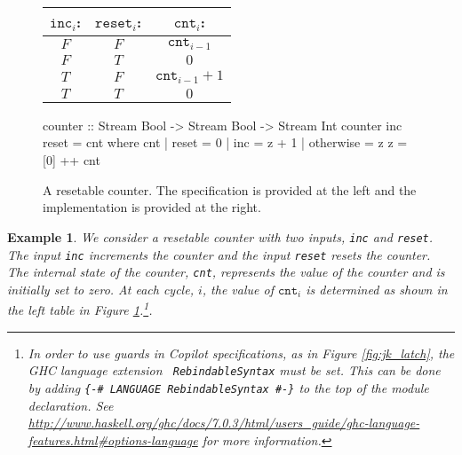 \documentclass[a4paper, 10pt]{article}
\theoremstyle{example}
\newtheorem{example}{Example}%
\begin{document}
\begin{figure}[ht!]
\begin{minipage}{0.3\linewidth}
\begin{tabular}{c|c|c}
$\mathtt{inc}_i$: & $\mathtt{reset}_i$: & $\mathtt{cnt}_i$: \\
\hline
$F$ & $F$ & $\mathtt{cnt}_{i-1}$ \\
\hline
$F$ & $T$ & $0$ \\
\hline
$T$ & $F$ & $\mathtt{cnt}_{i-1} + 1$ \\
\hline
$T$ & $T$ & $0$
\end{tabular}
\end{minipage}
\hspace{1cm}
\begin{minipage}{0.60\linewidth}
\begin{code}
counter :: Stream Bool -> Stream Bool -> Stream Int
counter inc reset = cnt
  where
    cnt | reset     = 0
        | inc       = z + 1
        | otherwise = z
    z = [0] ++ cnt
\end{code}
\end{minipage}
\caption{A resetable counter. The specification is provided at the left and the
implementation is provided at the right.
}
\label{fig:counter}
\end{figure}

\begin{example}
We consider a resetable counter with two inputs, {\tt inc} and {\tt reset}.  The
input {\tt inc} increments the counter and the input {\tt reset} resets the
counter. The internal state of the counter, {\tt cnt}, represents the value of
the counter and is initially set to zero. At each cycle, $i$, the value of
$\mathtt{cnt}_i$ is determined as shown in the left table in Figure
\ref{fig:counter}.\footnote{In order to use guards in Copilot specifications, as
  in Figure \ref{fig:jk_latch}, the GHC language extension {\tt
    RebindableSyntax} must be set.  This can be done by adding {\tt \{-\#
    LANGUAGE RebindableSyntax \#-\}} to the top of the module declaration.  See
  \url{http://www.haskell.org/ghc/docs/7.0.3/html/users_guide/ghc-language-features.html#options-language}
  for more information.}.
\end{example}

\end{document}
